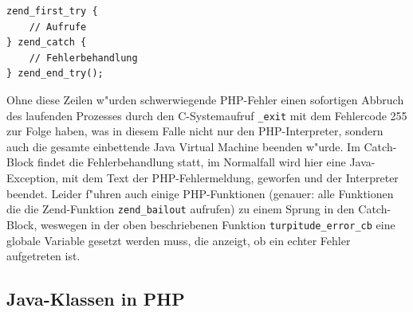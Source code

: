 \begin{lstlisting}[caption=Zend Try-Catch Block]
zend_first_try {
    // Aufrufe
} zend_catch {
    // Fehlerbehandlung
} zend_end_try();
\end{lstlisting}
Ohne diese Zeilen w"urden schwerwiegende PHP-Fehler einen sofortigen Abbruch des laufenden Prozesses durch den C-Systemaufruf
\texttt{\_exit} mit dem Fehlercode 255 zur Folge haben, was in diesem Falle nicht nur den PHP-Interpreter, sondern auch die gesamte 
einbettende Java Virtual Machine beenden w"urde. Im Catch-Block findet die Fehlerbehandlung statt, im Normalfall wird hier eine
Java-Exception, mit dem Text der PHP-Fehlermeldung, geworfen und der Interpreter beendet. Leider f"uhren auch einige PHP-Funktionen
(genauer: alle Funktionen die die Zend-Funktion \texttt{zend\_bailout} aufrufen)
zu einem Sprung in den Catch-Block, weswegen in der oben beschriebenen Funktion \texttt{turpitude\_error\_cb} eine globale Variable
gesetzt werden muss, die anzeigt, ob ein echter Fehler aufgetreten ist.

\subsection{Java-Klassen in PHP}
\label{sec:chap1:impl:4}

